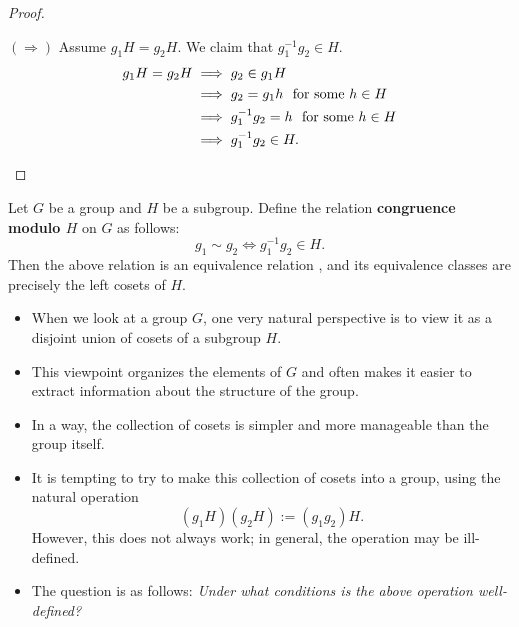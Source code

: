 \begin{proof}
\begin{enumerate}
        \( (\Longrightarrow)  \) Assume \( {g}_{1} H = {g}_{2} H  \). We claim that \( {g}_{1}^{-1} {g}_{2} \in H  \).  
        \begin{align*}
            {g}_{1} H = {g}_{2} H &\implies {g}_{2} \in {g}_{1} H   \\
                                  &\implies {g}_{2} = {g}_{1} h \ \ \text{for some \( h \in  H \)} \\
                                  &\implies  {g}_{1}^{-1} {g}_{2}  =  h  \ \ \text{for some \( h \in H  \)} \\
                                  &\implies  {g}_{1}^{-1} {g}_{2} \in H. 
        \end{align*}
\end{enumerate}



\end{proof}

\begin{theorem}
   Let \( G \) be a group and \( H  \) be a subgroup. Define the relation \textbf{congruence modulo \( H \)} on \( G  \) as follows:
   \[  {g}_{1} \sim {g}_{2} \iff {g}_{1}^{-1} {g}_{2} \in H. \]
   Then the above relation is an equivalence relation , and its equivalence classes are precisely the left cosets of \( H  \).
\end{theorem}

\begin{remark}
   \begin{itemize}
       \item When we look at a group \( G  \), one very natural perspective is to view it as a disjoint union of cosets of a subgroup \( H  \).
        \item This viewpoint organizes the elements of \( G  \) and often makes it easier to extract information about the structure of the group.
        \item In a way, the collection of cosets is simpler and more manageable than the group itself.
   \end{itemize} 
\end{remark}

\begin{remark}
    \begin{itemize}
        \item It is tempting to try to make this collection of cosets into a group, using the natural operation 
            \[  ({g}_{1}H) ({g}_{2}H) := ({g}_{1} {g}_{2}) H.  \]
        However, this does not always work; in general, the operation may be ill-defined.
    \item The question is as follows: \textit{Under what conditions is the above operation well-defined?}
    \end{itemize}
\end{remark}

